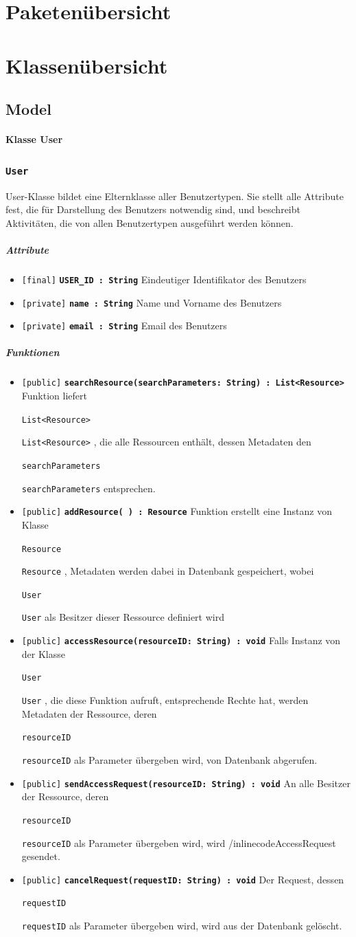 \documentclass[parskip=full,11pt]{scrartcl}
\makeatletter
\newcommand{\lstInline}[2][,]{%
	\begingroup%
	\lstset{#1}%
	\begin{lrbox}{\mylisting}\lstinline!#2!\end{lrbox}%
	\setlength{\@tempdima}{\linegoal}%
	\ifdim\wd\mylisting>\@tempdima\hfill\\\fi%
	\lstinline!#2!%
	\endgroup%
}
\newcommand{\class}[1]{\subsubsection*{\lstinline[basicstyle=\ttfamily\large]{#1}}}
\newcommand{\atr}[4]{\lstinline{[#3]} \textbf{\lstinline{#1 : #2}} \newline #4}
\newcommand{\mtd}[5]{\lstinline{[#4]} \textbf{\lstinline{#1(#3) : #2}} \newline #5}
\newcommand{\inlinecode}[1]{\lstInline[breaklines=true]{#1}}
\makeatother
\begin{document}
 
 \section{Paketenübersicht}
 
 \newpage
 \section{Klassenübersicht}
 \subsection{Model}
 \paragraph*{Klasse User}
 \class{User}
 User-Klasse bildet eine Elternklasse aller Benutzertypen. Sie stellt alle Attribute fest, die für Darstellung des Benutzers notwendig sind, und beschreibt Aktivitäten, die von allen Benutzertypen ausgeführt werden können.
\subparagraph*{Attribute} %
\begin{itemize}
	\item \atr{USER_ID}{String}{final} {Eindeutiger Identifikator des Benutzers}
	\item \atr{name}{String}{private}{Name und Vorname des Benutzers}	
	\item \atr{email}{String}{private}{Email des Benutzers}
\end{itemize}

\subparagraph*{Funktionen}  %
\begin{itemize}
	\item \mtd{searchResource}{List<Resource>}{searchParameters: String} {public}{Funktion liefert  \inlinecode{List<Resource>}, die alle Ressourcen enthält, dessen Metadaten den \inlinecode{searchParameters} entsprechen.}
	
	\item \mtd{addResource}{Resource}{ }{public}{Funktion erstellt eine Instanz von Klasse \inlinecode{Resource}, Metadaten werden dabei in Datenbank gespeichert, wobei \inlinecode{User} als Besitzer dieser Ressource definiert wird}
	
	\item \mtd{accessResource}{void}{resourceID: String} {public}{Falls Instanz von der Klasse \inlinecode{User}, die diese Funktion aufruft, entsprechende Rechte hat, werden Metadaten der Ressource, deren \inlinecode{resourceID}} als Parameter übergeben wird, von Datenbank abgerufen.
	
	\item \mtd{sendAccessRequest}{void}{resourceID: String} {public}
	{An alle Besitzer der Ressource, deren \inlinecode{resourceID} als Parameter übergeben wird, wird /inlinecode{AccessRequest} gesendet.}
	
	\item \mtd{cancelRequest}{void}{requestID: String} {public}{Der Request, dessen \inlinecode{requestID}} als Parameter übergeben wird, wird aus der Datenbank gelöscht.
\end{itemize}
\end{document}
